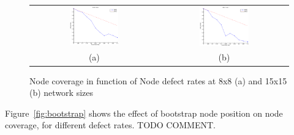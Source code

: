 \begin{figure}
  \centering
  \begin{tabular}{cc}
    \includegraphics[width=0.40\textwidth]{pictures/sim8x8_boot27_Xdefect_Ycoverage.eps} & 
    \includegraphics[width=0.40\textwidth]{pictures/sim15x15_boot127_Xdefect_Ycoverage.eps} \\
    (a) & (b)
  \end{tabular}
  \caption{Node coverage in function of Node defect rates at 8x8 (a) and 15x15 (b) network sizes}
  \label{fig:coverage}
\end{figure}

Figure~\ref{fig:bootstrap} shows the effect of bootstrap node position
on node coverage, for different defect rates. TODO COMMENT.

